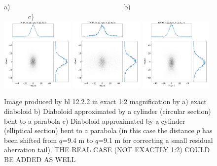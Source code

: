 \documentclass{iucr}              %
\newcommand{\inred}[1]{{\color{red}#1}}
\begin{document}
\begin{figure}\label{fig:finalcomparison}
\flushleft
a)~~~~~~~~~~~~~~~~~~~~~~~~~~~~~~~~~b)~~~~~~~~~~~~~~~~~~~~~~~~~~~~~~c)\\
\centering
\includegraphics[width=0.32\textwidth]{figures/final_exact.png} 
\includegraphics[width=0.32\textwidth]{figures/final_approx1.png} 
\includegraphics[width=0.32\textwidth]{figures/final_approx2corrected.png} 

\caption{ Image produced by bl 12.2.2 in exact 1:2 magnification by 
a) exact diaboloid b) Diaboloid approximated by a cylinder (circular section) bent to a parabola c) Diaboloid approximated by a cylinder (elliptical section) bent to a parabola (in this case the distance $p$ has been shifted from $q$=9.4 m to $q$=9.1 m for correcting a small residual aberration tail). \inred{THE REAL CASE (NOT EXACTLY 1:2) COULD BE ADDED AS WELL} 
}
\end{figure}


\end{document}
